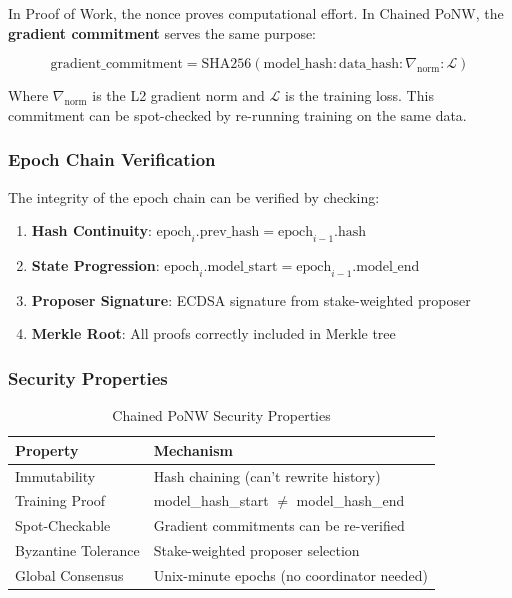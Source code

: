 \documentclass[11pt,a4paper]{article}
\begin{document}
In Proof of Work, the nonce proves computational effort. In Chained PoNW, the \textbf{gradient commitment} serves the same purpose:

\begin{equation}
\text{gradient\_commitment} = \text{SHA256}(\text{model\_hash} : \text{data\_hash} : \nabla_{\text{norm}} : \mathcal{L})
\end{equation}

Where $\nabla_{\text{norm}}$ is the L2 gradient norm and $\mathcal{L}$ is the training loss. This commitment can be spot-checked by re-running training on the same data.

\subsubsection{Epoch Chain Verification}

The integrity of the epoch chain can be verified by checking:
\begin{enumerate}
    \item \textbf{Hash Continuity}: $\text{epoch}_i.\text{prev\_hash} = \text{epoch}_{i-1}.\text{hash}$
    \item \textbf{State Progression}: $\text{epoch}_i.\text{model\_start} = \text{epoch}_{i-1}.\text{model\_end}$
    \item \textbf{Proposer Signature}: ECDSA signature from stake-weighted proposer
    \item \textbf{Merkle Root}: All proofs correctly included in Merkle tree
\end{enumerate}

\subsubsection{Security Properties}

\begin{table}[H]
\centering
\caption{Chained PoNW Security Properties}
\begin{tabular}{@{}ll@{}}
\toprule
\textbf{Property} & \textbf{Mechanism} \\
\midrule
Immutability & Hash chaining (can't rewrite history) \\
Training Proof & model\_hash\_start $\neq$ model\_hash\_end \\
Spot-Checkable & Gradient commitments can be re-verified \\
Byzantine Tolerance & Stake-weighted proposer selection \\
Global Consensus & Unix-minute epochs (no coordinator needed) \\
\bottomrule
\end{tabular}
\end{table}
\end{document}
